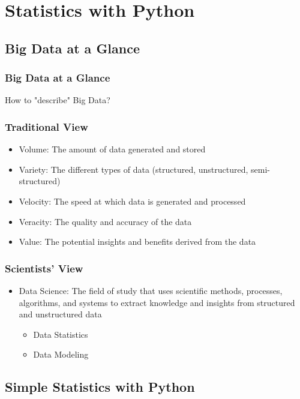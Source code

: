 \documentclass{beamer}
\begin{document}
    \section{Statistics with Python}
    \subsection{Big Data at a Glance}
    \begin{frame}
        \frametitle{Big Data at a Glance}
        \begin{center}
            \Huge How to "describe" Big Data?
        \end{center}
    \end{frame}
    \begin{frame}
        \frametitle{Traditional View}
        \begin{itemize}
            \item Volume: The amount of data generated and stored
            \item Variety: The different types of data (structured, unstructured, semi-structured)
            \item Velocity: The speed at which data is generated and processed
            \item Veracity: The quality and accuracy of the data
            \item Value: The potential insights and benefits derived from the data
        \end{itemize}
    \end{frame}
    \begin{frame}
        \frametitle{Scientists' View}
        \begin{itemize}
            \item Data Science: The field of study that uses scientific methods, processes, algorithms, and systems to extract knowledge and insights from structured and unstructured data
            \begin{itemize}
                \item Data Statistics
                \item Data Modeling
            \end{itemize}
        \end{itemize}
    \end{frame}
    \subsection{Simple Statistics with Python}
\end{document}
